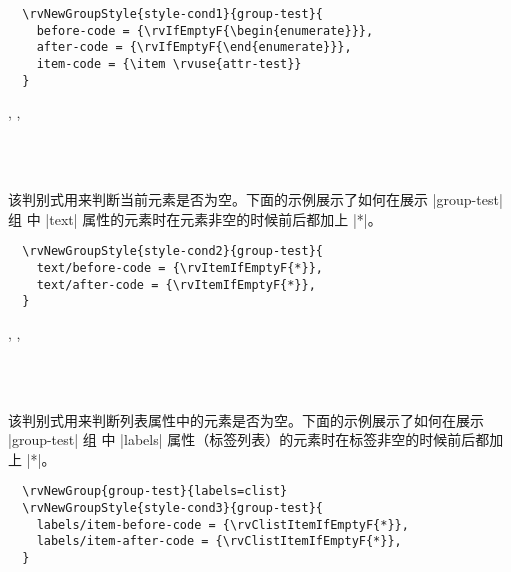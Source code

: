 \documentclass[full]{l3doc}
\begin{document}
\begin{documentation}
\begin{verbatim}
  \rvNewGroupStyle{style-cond1}{group-test}{
    before-code = {\rvIfEmptyF{\begin{enumerate}}},
    after-code = {\rvIfEmptyF{\end{enumerate}}},
    item-code = {\item \rvuse{attr-test}}
  }
\end{verbatim}

\begin{function}{\rvItemIfEmptyT, \rvItemIfEmptyF, \rvItemIfEmptyTF}
  \begin{syntax}
       \\
      \\
     
  \end{syntax}

  该判别式用来判断当前元素是否为空。下面的示例展示了如何在展示 |group-test| 组
  中 |text| 属性的元素时在元素非空的时候前后都加上 |*|。
\end{function}

\begin{verbatim}
  \rvNewGroupStyle{style-cond2}{group-test}{
    text/before-code = {\rvItemIfEmptyF{*}},
    text/after-code = {\rvItemIfEmptyF{*}},
  }
\end{verbatim}

\begin{function}{\rvClistItemIfEmptyT, \rvClistItemIfEmptyF, \rvClistItemIfEmptyTF}
  \begin{syntax}
       \\
      \\
     
  \end{syntax}

  该判别式用来判断列表属性中的元素是否为空。下面的示例展示了如何在展示 |group-test| 组
  中 |labels| 属性（标签列表）的元素时在标签非空的时候前后都加上 |*|。
\end{function}

\begin{verbatim}
  \rvNewGroup{group-test}{labels=clist}
  \rvNewGroupStyle{style-cond3}{group-test}{
    labels/item-before-code = {\rvClistItemIfEmptyF{*}},
    labels/item-after-code = {\rvClistItemIfEmptyF{*}},
  }
\end{verbatim}


\end{documentation}
\end{document}

